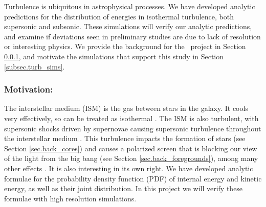 Turbulence is ubiquitous in astrophysical processes.  We have developed analytic
predictions for the distribution of energies in isothermal turbulence, both
supersonic and subsonic. These simulations will verify our analytic predictions,
and examine if deviations seen in preliminary studies are due to lack of
resolution or interesting physics.
We provide the background for the \nameTurbulence\ project in Section
\ref{subsec.turb_motivate},
and motivate the simulations that support this study in Section
\ref{subsec.turb_sims}.


\subsubsection{Motivation: \nameTurbulence}
\label{subsec.turb_motivate}

The interstellar medium (ISM) is the gas between stars in the galaxy.  It cools
very effectively, so can be treated as isothermal \citep{Krumholz14}.  The ISM is also turbulent, with supersonic shocks driven by supernovae
causing supersonic turbulence throughout the interstellar medium
\citep{Elmegreen04}.  This
turbulence impacts the formation of stars (see Section \ref{sec.back_cores}) and
causes a polarized screen that is blocking our view of the light from the big bang (see
Section \ref{sec.back_foregrounds}), among many other effects
\citep{Elmegreen04}. It is also interesting in its own right.  We have developed
analytic formulae for the probability density function (PDF) of internal energy
and kinetic energy, as well as their joint distribution.  In this project we
will verify these formulae with high resolution simulations.

